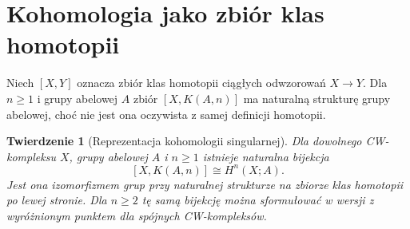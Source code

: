 \documentclass[11pt,a4paper,oneside]{report}
\theoremstyle{plain}
\newtheorem{twierdzenie}{Twierdzenie}[section]
\theoremstyle{definition}
\theoremstyle{remark}
\begin{document}
\section{Kohomologia jako zbiór klas homotopii}
Niech $[X,Y]$ oznacza zbiór klas homotopii ciągłych
odwzorowań $X\to Y$. Dla $n\ge1$ i grupy abelowej $A$
zbiór $[X,K(A,n)]$ ma naturalną strukturę grupy abelowej,
choć nie jest ona oczywista z samej definicji homotopii.

\begin{twierdzenie}[Reprezentacja kohomologii singularnej]
\label{thm:rep-coho-v6}
Dla dowolnego CW-kompleksu $X$, grupy abelowej $A$ i
$n\ge1$ istnieje naturalna bijekcja
\[
[X,K(A,n)]\cong H^n(X;A).
\]
Jest ona izomorfizmem grup przy naturalnej strukturze
na zbiorze klas homotopii po lewej stronie.
Dla $n\ge2$ tę samą bijekcję można sformułować
w wersji z wyróżnionym punktem dla spójnych CW-kompleksów.
\end{twierdzenie}
\end{document}
